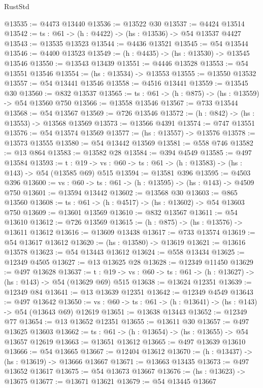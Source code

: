 \begin{lexlean}{RustStd}
\begin{coremodule}
@13535 := @4473 @13440
@13536 := @13522 @30
@13537 := @4424 @13514
@13542 := {ts : @61} -> (h : @4422) -> (hs : @13536) -> @54 @13537 @4427
@13543 := @13535 @13523
@13544 := @4436 @13521
@13545 := @54 @13544
@13546 := @4400 @13523
@13549 := (h : @4435) -> (hs : @13530) -> @13545 @13546
@13550 := @13543 @13439
@13551 := @4446 @13528
@13553 := @54 @13551 @13546
@13554 := (hs : @13534) -> @13553
@13555 := @13550 @13532
@13557 := @54 @13441 @13546
@13558 := @4516 @13441
@13559 := @13545 @30
@13560 := @832 @13537
@13565 := {ts : @61} -> (h : @875) -> (hs : @13559) -> @54 @13560 @750
@13566 := @13558 @13546
@13567 := @733 @13544
@13568 := @54 @13567
@13569 := @726 @13546
@13572 := (h : @842) -> (hs : @13553) -> @13568 @13569
@13573 := @13566 @4391
@13574 := @747 @13551
@13576 := @54 @13574 @13569
@13577 := (hs : @13557) -> @13576
@13578 := @13573 @13555
@13580 := @54 @13442 @13569
@13581 := @558 @746
@13582 := @13 @864
@13583 := @13582 @28
@13584 := @394 @4549
@13585 := @497 @13584
@13593 := {t : @19} ->
  {vs : @60} -> {ts : @61} -> (h : @13583) -> (hs : @143) -> @54 (@13585 @69) @515
@13594 := @13581 @396
@13595 := @4503 @396
@13600 := {vs : @60} -> {ts : @61} -> (h : @13595) -> (hs : @143) -> @4509 @750
@13601 := @13594 @13442
@13602 := @13568 @30
@13603 := @865 @13560
@13608 := {ts : @61} -> (h : @4517) -> (hs : @13602) -> @54 @13603 @750
@13609 := @13601 @13569
@13610 := @832 @13567
@13611 := @54 @13610
@13612 := @726 @13569
@13615 := (h : @875) -> (hs : @13576) -> @13611 @13612
@13616 := @13609 @13438
@13617 := @733 @13574
@13619 := @54 @13617 @13612
@13620 := (hs : @13580) -> @13619
@13621 := @13616 @13578
@13623 := @54 @13443 @13612
@13624 := @558 @13434
@13625 := @12349 @4505
@13627 := @13 @13625 @28
@13628 := @12349 @11450
@13629 := @497 @13628
@13637 := {t : @19} ->
  {vs : @60} -> {ts : @61} -> (h : @13627) -> (hs : @143) -> @54 (@13629 @69) @515
@13638 := @13624 @12351
@13639 := @12349 @84
@13641 := @13 @13639 @12351
@13642 := @12349 @4549
@13643 := @497 @13642
@13650 := {vs : @60} -> {ts : @61} -> (h : @13641) -> (hs : @143) -> @54 (@13643 @69) @12619
@13651 := @13638 @13443
@13652 := @12349 @77
@13654 := @13 @13652 @12351
@13655 := @13611 @30
@13657 := @497 @13625 @13603
@13662 := {ts : @61} -> (h : @13654) -> (hs : @13655) -> @54 @13657 @12619
@13663 := @13651 @13612
@13665 := @497 @13639 @13610
@13666 := @54 @13665
@13667 := @12404 @13612
@13670 := (h : @13437) -> (hs : @13619) -> @13666 @13667
@13671 := @13663 @13435
@13673 := @497 @13652 @13617
@13675 := @54 @13673 @13667
@13676 := (hs : @13623) -> @13675
@13677 := @13671 @13621
@13679 := @54 @13445 @13667

\end{coremodule}
\end{lexlean}
